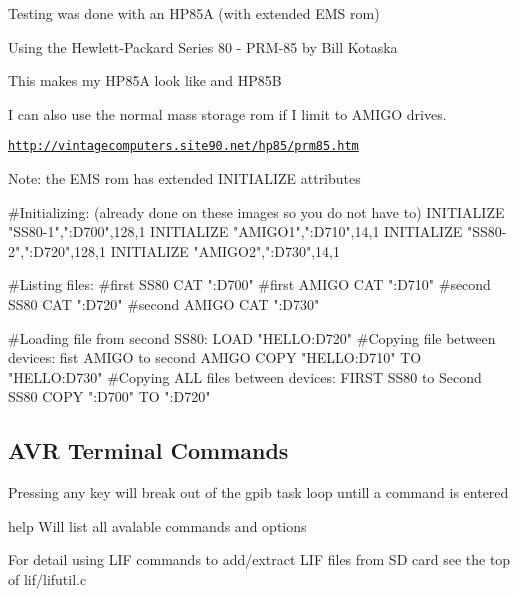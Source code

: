 \begin{DoxyItemize}
\item Testing was done with an H\+P85A (with extended E\+MS rom)
\begin{DoxyItemize}
\item Using the Hewlett-\/\+Packard Series 80 -\/ P\+R\+M-\/85 by Bill Kotaska
\item This makes my H\+P85A look like and H\+P85B
\begin{DoxyItemize}
\item I can also use the normal mass storage rom if I limit to A\+M\+I\+GO drives.
\item \href{http://vintagecomputers.site90.net/hp85/prm85.htm}{\tt http\+://vintagecomputers.\+site90.\+net/hp85/prm85.\+htm}
\end{DoxyItemize}
\end{DoxyItemize}
\item Note\+: the E\+MS rom has extended I\+N\+I\+T\+I\+A\+L\+I\+ZE attributes 
\begin{DoxyPre}
  #Initializing: (already done on these images so you do not have to)
  INITIALIZE "SS80-1",":D700",128,1
  INITIALIZE "AMIGO1",":D710",14,1
  INITIALIZE "SS80-2",":D720",128,1
  INITIALIZE "AMIGO2",":D730",14,1\end{DoxyPre}

\end{DoxyItemize}


\begin{DoxyPre}  #Listing files:
  #first SS80
  CAT ":D700"
  #first AMIGO
  CAT ":D710"
  #second SS80
  CAT ":D720"
  #second AMIGO
  CAT ":D730"\end{DoxyPre}



\begin{DoxyPre}  #Loading file from second SS80:
  LOAD "HELLO:D720"
  #Copying file between devices: fist AMIGO to second AMIGO
  COPY "HELLO:D710" TO "HELLO:D730"
  #Copying ALL files between devices: FIRST SS80 to Second SS80
  COPY ":D700" TO ":D720"
\end{DoxyPre}
 



\subsection*{A\+VR Terminal Commands}


\begin{DoxyItemize}
\item Pressing any key will break out of the gpib task loop untill a command is entered
\begin{DoxyItemize}
\item help Will list all avalable commands and options
\item For detail using L\+IF commands to add/extract L\+IF files from SD card see the top of lif/lifutil.\+c 


\end{DoxyItemize}
\end{DoxyItemize}

